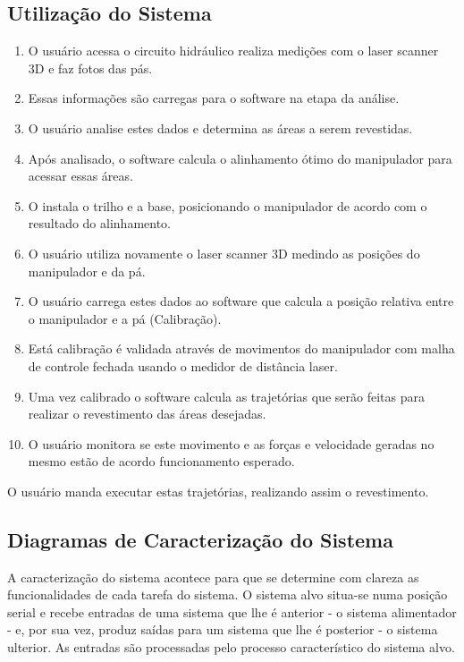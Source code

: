 \documentclass[12pt,a4paper]{article}
\begin{document}
\subsection {Utilização do Sistema}
\begin {enumerate}
  \item O usuário acessa o circuito hidráulico realiza medições com o laser scanner 3D e faz fotos das pás.
  \item Essas informações são carregas para o software na etapa da análise.
  \item O usuário analise estes dados e determina as áreas a serem revestidas.
  \item Após analisado, o software calcula o alinhamento ótimo do manipulador
para acessar essas áreas.
  \item O instala o trilho e a base, posicionando o manipulador de acordo com o
resultado do alinhamento.
  \item O usuário utiliza novamente o laser scanner 3D medindo as posições do
manipulador e da pá.
  \item O usuário carrega estes dados ao software que calcula a posição relativa
  entre o manipulador e a pá (Calibração).
  \item Está calibração é validada através de movimentos do manipulador com
  malha de controle fechada usando o medidor de distância laser.
  \item Uma vez calibrado o software calcula as trajetórias que serão feitas
  para realizar o revestimento das áreas desejadas.
  \item O usuário monitora se este movimento e as forças e velocidade geradas no
  mesmo estão de acordo funcionamento esperado.
\end{enumerate}

O usuário manda executar estas trajetórias, realizando assim o revestimento. 

\subsection {Diagramas de Caracterização do Sistema}
A caracterização do sistema acontece para que se determine com clareza as
funcionalidades de cada tarefa do sistema. O sistema alvo situa-se numa posição serial e recebe entradas de 
uma sistema que lhe é anterior - o sistema alimentador - e, por sua vez, produz saídas para um sistema que 
lhe é posterior - o sistema ulterior. As entradas são processadas pelo processo característico do sistema alvo.
\end{document}

